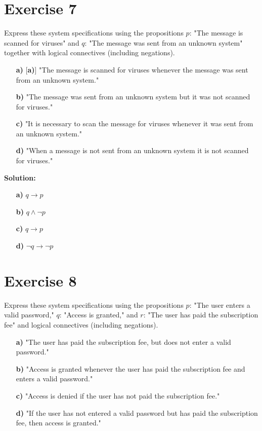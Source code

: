 \documentclass{Axon}
\begin{document}
\section*{Exercise 7}
Express these system specifications using the propositions \(p\): "The message is scanned for viruses" and \(q\): "The message was sent from an unknown system" together with logical connectives (including negations).
\begin{enumerate}
    \item[\textbf{a)}][\textbf{a)}] "The message is scanned for viruses whenever the message was sent from an unknown system."
    \item[\textbf{b)}] "The message was sent from an unknown system but it was not scanned for viruses."
    \item[\textbf{c)}] "It is necessary to scan the message for viruses whenever it was sent from an unknown system."
    \item[\textbf{d)}] "When a message is not sent from an unknown system it is not scanned for viruses."
\end{enumerate}

\noindent
\textbf{Solution:}
\begin{enumerate}
    \item[\textbf{a)}] \(q \to p\)
    \item[\textbf{b)}] \(q \land \lnot p\)
    \item[\textbf{c)}] \(q \to p\)
    \item[\textbf{d)}] \(\lnot q \to \lnot p\)
\end{enumerate}

\section*{Exercise 8}
Express these system specifications using the propositions \(p\): "The user enters a valid password," \(q\): "Access is granted," and \(r\): "The user has paid the subscription fee" and logical connectives (including negations).
\begin{enumerate}
    \item[\textbf{a)}] "The user has paid the subscription fee, but does not enter a valid password."
    \item[\textbf{b)}] "Access is granted whenever the user has paid the subscription fee and enters a valid password."
    \item[\textbf{c)}] "Access is denied if the user has not paid the subscription fee."
    \item[\textbf{d)}] "If the user has not entered a valid password but has paid the subscription fee, then access is granted."
\end{enumerate}
\end{document}
